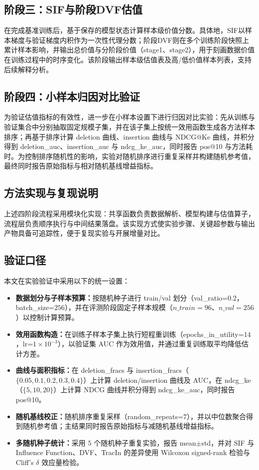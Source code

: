 \documentclass[12pt,a4paper]{ctexart}
\theoremstyle{definition}
\theoremstyle{plain}
\begin{document}
\subsection{阶段三：SIF与阶段DVF估值}
在完成基准训练后，基于保存的模型状态计算样本级价值分数。具体地，SIF以样本梯度与验证梯度内积作为一次性代理分数；阶段DVF则在多个训练阶段快照上累计样本影响，并输出总价值与分阶段价值（stage1、stage2），用于刻画数据价值在训练过程中的时序变化。该阶段输出样本级估值表及高/低价值样本列表，支持后续解释分析。

\subsection{阶段四：小样本归因对比验证}
为验证估值指标的有效性，进一步在小样本设置下进行归因对比实验：先从训练与验证集合中分别抽取固定规模子集，并在该子集上按统一效用函数生成各方法样本排序；再基于排序计算 deletion 曲线、insertion 曲线与 NDCG@Ke 曲线，并积分得到 deletion\_auc、insertion\_auc 与 ndcg\_ke\_auc，同时报告 pos@10 与方法耗时。为控制排序随机性的影响，实验对随机排序进行重复采样并构建随机参考值，最终同时报告原始指标与相对随机基线增益指标。

\subsection{方法实现与复现说明}
上述四阶段流程采用模块化实现：共享函数负责数据解析、模型构建与估值算子，流程层负责顺序执行与中间结果落盘。该实现方式使实验步骤、关键超参数与输出产物具备可追踪性，便于复现实验与开展增量对比。

\subsection{验证口径}
本文在实验验证中采用以下的统一设置：
\begin{itemize}
    \item \textbf{数据划分与子样本预算：}按随机种子进行 train/val 划分（val\_ratio=$0.2$，batch\_size=$256$），并在评测阶段固定子样本规模（$n\_{train}=96$、$n\_{val}=256$）以控制计算预算。
    \item \textbf{效用函数构造：}在训练子样本子集上执行短程重训练（epochs\_in\_utility=$14$，lr=$1\times10^{-3}$），以验证集 AUC 作为效用值，并通过重复训练取平均降低估计方差。
    \item \textbf{曲线与面积指标：}在 deletion\_fracs 与 insertion\_fracs（$\{0.05,0.1,0.2,0.3,0.4\}$）上计算 deletion/insertion 曲线及 AUC，在 ndcg\_ke（$\{5,10,20\}$）上计算 NDCG 曲线并积分得到 ndcg\_ke\_auc，同时报告 pos@10。
    \item \textbf{随机基线校正：}随机排序重复采样（random\_repeats=$7$），并以中位数聚合得到随机参考值；主结果同时报告原始指标与减随机基线增益指标。
    \item \textbf{多随机种子统计：}采用 $5$ 个随机种子重复实验，报告 mean$\pm$std，并对 SIF 与 Influence Function、DVF、TracIn 的差异使用 Wilcoxon signed-rank 检验与 Cliff's $\delta$ 效应量检验。
\end{itemize}
\end{document}
